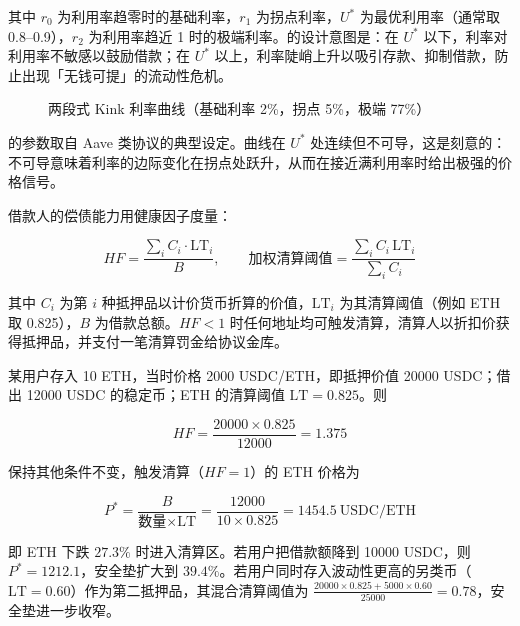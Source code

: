 其中 $r_0$ 为利用率趋零时的基础利率，$r_1$ 为拐点利率，$U^{*}$ 为最优利用率（通常取 0.8--0.9），$r_2$ 为利用率趋近 1 时的极端利率。的设计意图是：在 $U^{*}$ 以下，利率对利用率不敏感以鼓励借款；在 $U^{*}$ 以上，利率陡峭上升以吸引存款、抑制借款，防止出现「无钱可提」的流动性危机。

\begin{figure}[htbp]
\centering
{}
\caption{两段式 Kink 利率曲线（基础利率 2\%，拐点 5\%，极端 77\%）}\label{fig:03-kink}
\end{figure}

的参数取自 Aave 类协议的典型设定。曲线在 $U^{*}$ 处连续但不可导，这是刻意的：不可导意味着利率的边际变化在拐点处跃升，从而在接近满利用率时给出极强的价格信号。

借款人的偿债能力用健康因子度量：

\begin{equation}
  HF = \frac{\sum_{i} C_i\cdot \text{LT}_i}{B},\qquad
  \text{加权清算阈值} = \frac{\sum_i C_i\,\text{LT}_i}{\sum_i C_i}
  \label{eq:03-hf}
\end{equation}

其中 $C_i$ 为第 $i$ 种抵押品以计价货币折算的价值，$\text{LT}_i$ 为其清算阈值（例如 ETH 取 0.825），$B$ 为借款总额。$HF<1$ 时任何地址均可触发清算，清算人以折扣价获得抵押品，并支付一笔清算罚金给协议金库。

\begin{example}[健康因子与清算触发价格]\label{ex:03-hf}
某用户存入 10 ETH，当时价格 2000 USDC/ETH，即抵押价值 20000 USDC；借出 12000 USDC 的稳定币；ETH 的清算阈值 $\text{LT}=0.825$。则

\[
  HF = \frac{20000\times 0.825}{12000} = 1.375
\]

保持其他条件不变，触发清算（$HF=1$）的 ETH 价格为

\[
  P^{*} = \frac{B}{\text{数量}\times\text{LT}} = \frac{12000}{10\times0.825} = 1454.5\ \text{USDC/ETH}
\]

即 ETH 下跌 $27.3\%$ 时进入清算区。若用户把借款额降到 10000 USDC，则 $P^{*} = 1212.1$，安全垫扩大到 $39.4\%$。若用户同时存入波动性更高的另类币（$\text{LT}=0.60$）作为第二抵押品，其混合清算阈值为 $\frac{20000\times0.825 + 5000\times0.60}{25000}=0.78$，安全垫进一步收窄。
\end{example}


